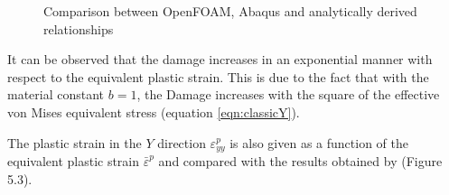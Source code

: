 \documentclass[sn-mathphys,Numbered,draft]{sn-jnl}%
\begin{document}
\begin{appendices}
\begin{figure}[htbp]
	\centering
	\caption{Comparison between OpenFOAM, Abaqus and analytically derived relationships}
	\label{label_for_entire_figure}
\end{figure}



It can be observed that the damage increases in an exponential manner with respect to the equivalent plastic strain. This is due to the fact that with the material constant $b=1$, the Damage increases with the square of the effective von Mises equivalent stress (equation \ref{eqn:classicY}).

The plastic strain in the $Y$ direction $\varepsilon^p_{yy}$ is also given as a function of the equivalent plastic strain ${\bar{\varepsilon}}^p$ and compared with the results obtained by \citet{doghri_numerical_1995} (Figure 5.3).


\end{appendices}
\end{document}
